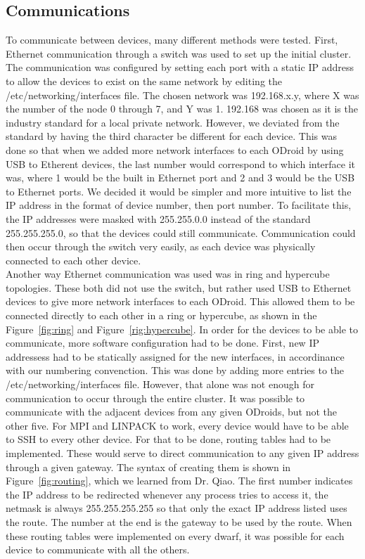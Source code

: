  \subsection{Communications}
To communicate between devices, many different methods were tested. First, Ethernet communication through a switch was used to set up the initial cluster. The communication was configured by setting each port with a static IP address to allow the devices to exist on the same network by editing the /etc/networking/interfaces file. The chosen network was 192.168.x.y, where X was the number of the node 0 through 7, and Y was 1. 192.168 was chosen as it is the industry standard for a local private network. However, we deviated from the standard by having the third character be different for each device. This was done so that when we added more network interfaces to each ODroid by using USB to Etherent devices, the last number would correspond to which interface it was, where 1 would be the built in Ethernet port and 2 and 3 would be the USB to Ethernet ports. We decided it would be simpler and more intuitive to list the IP address in the format of device number, then port number. To facilitate this, the IP addresses were masked with 255.255.0.0 instead of the standard 255.255.255.0, so that the devices could still communicate. Communication could then occur through the switch very easily, as each device was physically connected to each other device. \\

Another way Ethernet communication was used was in ring and hypercube topologies. These both did not use the switch, but rather used USB to Ethernet devices to give more network interfaces to each ODroid. This allowed them to be connected directly to each other in a ring or hypercube, as shown in the Figure~\ref{fig:ring} and Figure~\ref{rig:hypercube}. In order for the devices to be able to communicate, more software configuration had to be done. First, new IP addressess had to be statically assigned for the new interfaces, in accordinance with our numbering convenction. This was done by adding more entries to the /etc/networking/interfaces file. However, that alone was not enough for communication to occur through the entire cluster. It was possible to communicate with the adjacent devices from any given ODroids, but not the other five. For MPI and LINPACK to work, every device would have to be able to SSH to every other device. For that to be done, routing tables had to be implemented. These would serve to direct communication to any given IP address through a given gateway. The syntax of creating them is shown in Figure~\ref{fig:routing}, which we learned from Dr. Qiao. The first number indicates the IP address to be redirected whenever any process tries to access it, the netmask is always 255.255.255.255 so that only the exact IP address listed uses the route. The number at the end is the gateway to be used by the route. When these routing tables were implemented on every dwarf, it was possible for each device to communicate with all the others. \\

